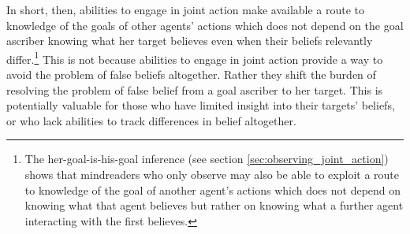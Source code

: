 \documentclass[12pt,\papersize]{extarticle}
\begin{document}
In short, then, abilities to engage in joint action make available a route to knowledge of the goals of other agents' actions which does not depend on the goal ascriber knowing what her target believes even when their beliefs relevantly differ.\footnote{
The her-goal-is-his-goal inference (see section \vref{sec:observing_joint_action}) 
shows that mindreaders who only observe may also be able to exploit a route to knowledge of the goal of another agent's actions which does not depend on knowing what that agent believes but rather on knowing what a further agent interacting with the first believes.
}
This is not because abilities to engage in joint action provide a way to avoid the problem of false beliefs altogether.
Rather they shift the burden of resolving the problem of false belief from a goal ascriber to her target.
This is potentially valuable for those who have limited insight into their targets' beliefs,
or who lack abilities to track differences in belief altogether.
\end{document}
